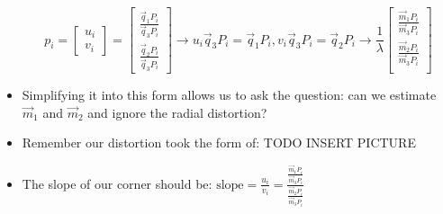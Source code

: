 \begin{itemize}
	$$p_i=\begin{bmatrix}
		u_i\\v_i
	\end{bmatrix}=\begin{bmatrix}
		\frac{\vec{q}_1 P_i}{\vec{q}_3 P_i}\\
		\frac{\vec{q}_2 P_i}{\vec{q}_3 P_i}
	\end{bmatrix}\to u_i\vec{q}_3 P_i = \vec{q}_1 P_i, v_i\vec{q}_3 P_i = \vec{q}_2 P_i\to \frac{1}{\lambda}\begin{bmatrix}
		\frac{\vec{m}_1 P_i}{\vec{m}_3 P_i} \\
		\frac{\vec{m}_2 P_i}{\vec{m}_3 P_i} \\
	\end{bmatrix}$$
	\item Simplifying it into this form allows us to ask the question: can we estimate $\vec{m}_1$ and $\vec{m}_2$ and ignore the radial distortion?
	\item Remember our distortion took the form of: TODO INSERT PICTURE
	\item The slope of our corner should be: 
	$\text{slope}=\frac{u_i}{v_i}=\frac{\frac{\vec{m}_1 P_i}{\vec{m}_3 P_i}}{\frac{\vec{m}_2 P_i}{\vec{m}_3 P_i}}$
\end{itemize}